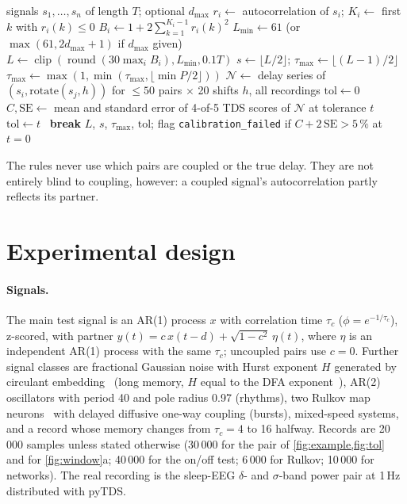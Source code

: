 \documentclass[11pt,a4paper]{article}
\newcommand{\tmax}{\tau_{\max}}
\newcommand{\tol}{\mathrm{tol}}
\begin{document}
\begin{algorithm}[t]
\caption{aTDS parameter selection (v2.1)}
\label{alg:atds}
\begin{algorithmic}[1]
\Require signals $s_1,\dots,s_n$ of length $T$; optional $d_{\max}$
  \State $r_i \gets$ autocorrelation of $s_i$; \quad $K_i \gets$ first $k$ with $r_i(k)\le 0$
  \State $B_i \gets 1 + 2\sum_{k=1}^{K_i-1} r_i(k)^2$
\EndFor
\State $L_{\min} \gets 61$ (or $\max(61, 2d_{\max}+1)$ if $d_{\max}$ given)
\State $L \gets \operatorname{clip}(\operatorname{round}(30\max_i B_i), L_{\min}, 0.1T)$ 
\State $s \gets \lfloor L/2\rfloor$; \quad $\tmax \gets \lfloor (L-1)/2 \rfloor$
 $\tmax \gets \max(1, \min(\tmax, \lfloor\min P/2\rfloor))$ \EndIf
\State $\mathcal{N} \gets$ delay series of $(s_i, \mathrm{rotate}(s_j, h))$ for $\le 50$ pairs $\times$ 20 shifts $h$, all recordings
\State $\tol \gets 0$
\For{$t = 0, 1, \dots, \max(1, \lfloor \tmax/4\rfloor)$}
  \State $C, \mathrm{SE} \gets$ mean and standard error of 4-of-5 TDS scores of $\mathcal{N}$ at tolerance $t$
   $\tol \gets t$ \Else\ \textbf{break} \EndIf
\EndFor
\State \Return $L$, $s$, $\tmax$, $\tol$; flag \texttt{calibration\_failed} if $C + 2\,\mathrm{SE} > 5\,\%$ at $t=0$
\end{algorithmic}
\end{algorithm}

The rules never use which pairs are coupled or the true delay. They are not entirely blind to coupling, however: a coupled signal's autocorrelation partly reflects its partner.

\section{Experimental design}
\label{sec:design}

\paragraph{Signals.} The main test signal is an AR(1) process $x$ with correlation time $\tau_c$ ($\phi = e^{-1/\tau_c}$), z-scored, with partner $y(t) = c\, x(t-d) + \sqrt{1-c^2}\,\eta(t)$, where $\eta$ is an independent AR(1) process with the same $\tau_c$; uncoupled pairs use $c = 0$. Further signal classes are fractional Gaussian noise with Hurst exponent $H$ generated by circulant embedding~\cite{davies1987tests} (long memory, $H$ equal to the DFA exponent~\cite{peng1995quantification}), AR(2) oscillators with period 40 and pole radius 0.97 (rhythms), two Rulkov map neurons~\cite{rulkov2002modeling} with delayed diffusive one-way coupling (bursts), mixed-speed systems, and a record whose memory changes from $\tau_c = 4$ to 16 halfway. Records are 20\,000 samples unless stated otherwise (30\,000 for the pair of \cref{fig:example,fig:tol} and for \cref{fig:window}a; 40\,000 for the on/off test; 6\,000 for Rulkov; 10\,000 for networks). The real recording is the sleep-EEG $\delta$- and $\sigma$-band power pair at 1\,Hz distributed with pyTDS.
\end{document}
